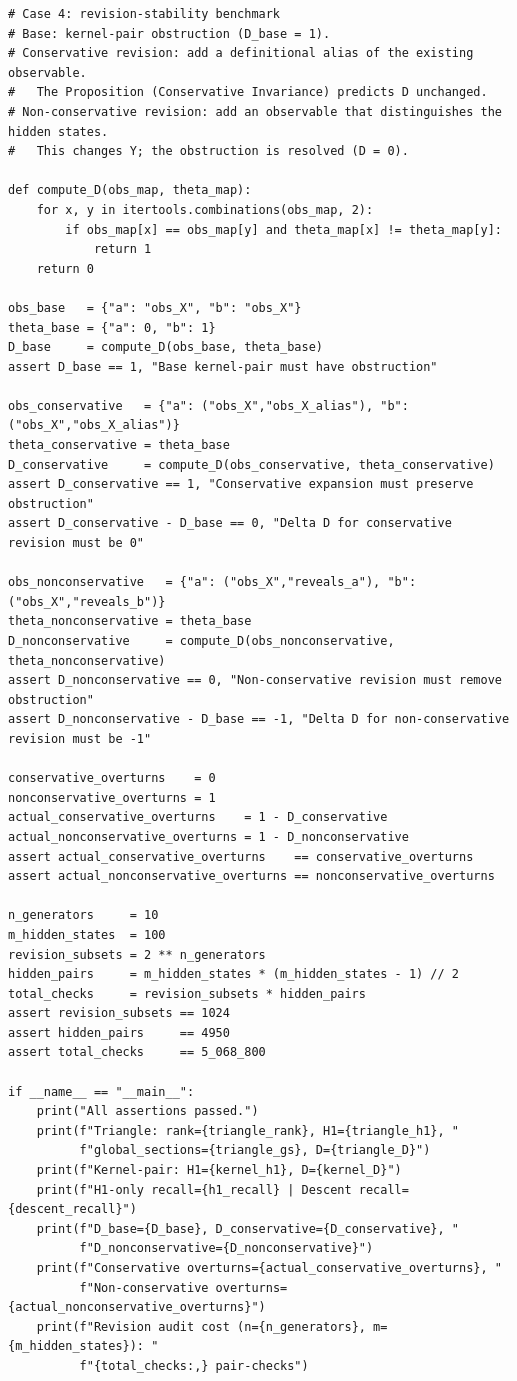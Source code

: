 \documentclass[11pt]{article}
\begin{document}
\begin{lstlisting}
# Case 4: revision-stability benchmark
# Base: kernel-pair obstruction (D_base = 1).
# Conservative revision: add a definitional alias of the existing observable.
#   The Proposition (Conservative Invariance) predicts D unchanged.
# Non-conservative revision: add an observable that distinguishes the hidden states.
#   This changes Y; the obstruction is resolved (D = 0).

def compute_D(obs_map, theta_map):
    for x, y in itertools.combinations(obs_map, 2):
        if obs_map[x] == obs_map[y] and theta_map[x] != theta_map[y]:
            return 1
    return 0

obs_base   = {"a": "obs_X", "b": "obs_X"}
theta_base = {"a": 0, "b": 1}
D_base     = compute_D(obs_base, theta_base)
assert D_base == 1, "Base kernel-pair must have obstruction"

obs_conservative   = {"a": ("obs_X","obs_X_alias"), "b": ("obs_X","obs_X_alias")}
theta_conservative = theta_base
D_conservative     = compute_D(obs_conservative, theta_conservative)
assert D_conservative == 1, "Conservative expansion must preserve obstruction"
assert D_conservative - D_base == 0, "Delta D for conservative revision must be 0"

obs_nonconservative   = {"a": ("obs_X","reveals_a"), "b": ("obs_X","reveals_b")}
theta_nonconservative = theta_base
D_nonconservative     = compute_D(obs_nonconservative, theta_nonconservative)
assert D_nonconservative == 0, "Non-conservative revision must remove obstruction"
assert D_nonconservative - D_base == -1, "Delta D for non-conservative revision must be -1"

conservative_overturns    = 0
nonconservative_overturns = 1
actual_conservative_overturns    = 1 - D_conservative
actual_nonconservative_overturns = 1 - D_nonconservative
assert actual_conservative_overturns    == conservative_overturns
assert actual_nonconservative_overturns == nonconservative_overturns

n_generators     = 10
m_hidden_states  = 100
revision_subsets = 2 ** n_generators
hidden_pairs     = m_hidden_states * (m_hidden_states - 1) // 2
total_checks     = revision_subsets * hidden_pairs
assert revision_subsets == 1024
assert hidden_pairs     == 4950
assert total_checks     == 5_068_800

if __name__ == "__main__":
    print("All assertions passed.")
    print(f"Triangle: rank={triangle_rank}, H1={triangle_h1}, "
          f"global_sections={triangle_gs}, D={triangle_D}")
    print(f"Kernel-pair: H1={kernel_h1}, D={kernel_D}")
    print(f"H1-only recall={h1_recall} | Descent recall={descent_recall}")
    print(f"D_base={D_base}, D_conservative={D_conservative}, "
          f"D_nonconservative={D_nonconservative}")
    print(f"Conservative overturns={actual_conservative_overturns}, "
          f"Non-conservative overturns={actual_nonconservative_overturns}")
    print(f"Revision audit cost (n={n_generators}, m={m_hidden_states}): "
          f"{total_checks:,} pair-checks")
\end{lstlisting}
\end{document}
